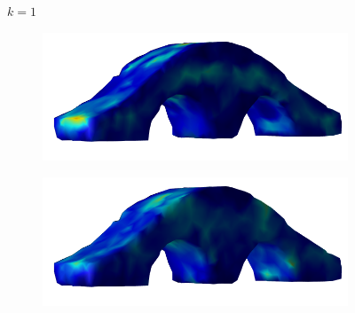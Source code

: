 \documentclass[11pt,titlepage]{article}
\begin{document}
\begin{figure}[!htbp]
    \begin{center}
        $k=1$
        \quad
        \begin{subfigure}[b]{0.4\textwidth}
            \centering
            \includegraphics[width=\textwidth]{jacopt_vm/resized/archbridge_tiny_1}
        \end{subfigure}
        \begin{subfigure}[b]{0.4\textwidth}
            \centering
            \includegraphics[width=\textwidth]{soropt_vm/resized/archbridge_tiny_1}
        \end{subfigure}\\ 


\end{center}
\end{figure}
\end{document}
